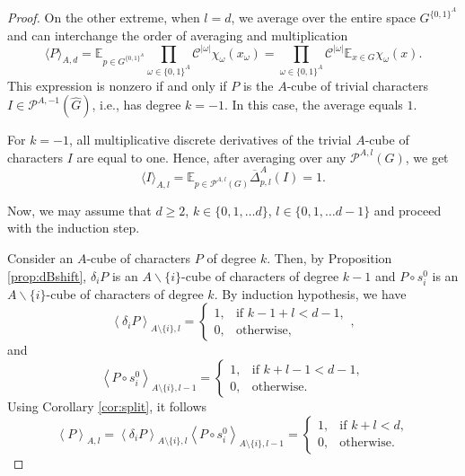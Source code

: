 \documentclass{amsart}
\theoremstyle{definition}
\theoremstyle{remark}
\numberwithin{equation}{section}
\begin{document}
\begin{proof}
On the other extreme, when $l=d$, we average over the entire space ${G}^{{\{0,1\}}^A}$ and can interchange the order of averaging and multiplication  
$$\langle P \rangle_{A,d} =
 \mathbb{E}_{p \in {G}^{{\{0,1\}}^A}}\prod_{\omega \in \{0,1\}^A} \mathcal{C}^{|\omega|} \chi_\omega (x_\omega) = 
\prod_{\omega \in \{0,1\}^A} \mathcal{C}^{|\omega|} \mathbb{E}_{x \in G}\chi_\omega (x).$$ 
This expression is nonzero if and only if $P$ is the $A$-cube of trivial characters  $I \in \mathcal{P}^{A,-1}(\widehat{G})$, i.e., has degree $k=-1$. In this case, the average equals $1$.

For $k=-1$, all multiplicative discrete derivatives of the trivial $A$-cube of characters $I$ are equal to one. Hence, after averaging over any $\mathcal{P}^{A,l}(G)$, we get  
$$\langle I \rangle_{A,l} = \mathbb{E}_{p \in  \mathcal{P}^{A,l}(G)} \overline{\Delta}^A_{p,l} (I) = 1.$$

Now, we may assume that $d\ge 2$, $k\in \{0,1, \dots d\} $,  $l\in \{0,1, \dots d-1\}$ and proceed with the induction step. 

Consider an $A$-cube of characters $P$ of degree $k$. Then, by Proposition \ref{prop:dBshift}, $\delta_i P$ is an $A\backslash  \{i\}$-cube of characters of degree $k-1$ and $ P \circ s_i^0$ is an $A\backslash \{i\}$-cube of characters of degree $k$. By induction hypothesis, we have
$$\left\langle \delta_i P \right\rangle_{A\setminus \{i\},l} = \begin{cases} 1, & \text{if } k-1 +l  < d -1, \\ 0, & \text{otherwise,} \end{cases},$$
and
$$\left\langle P \circ s_i^0 \right\rangle_{A\setminus \{i\},l-1} = \begin{cases} 1, & \text{if } k +l -1 < d -1, \\ 0, & \text{otherwise.} \end{cases}$$
Using Corollary \ref{cor:split}, it follows 
$$ \left\langle P \right\rangle_{A,l}  = 
\left\langle \delta_i P \right\rangle_{A\setminus \{i\},l} 
\left\langle P \circ s_i^0 \right\rangle_{A \setminus \{i\},l-1} =\begin{cases} 1, & \text{if } k + l  < d, \\ 0, & \text{otherwise.} \end{cases}
$$
\end{proof}
\end{document}
